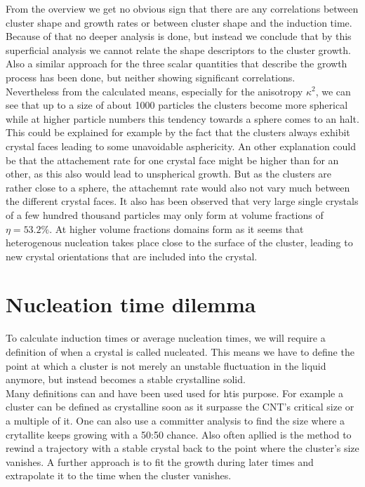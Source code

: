From the overview we get no obvious sign that there are any correlations between cluster shape and growth rates or between cluster shape and the induction time. Because of that no deeper analysis is done, but instead we conclude that by this superficial analysis we cannot relate the shape descriptors to the cluster growth. Also a similar approach for the three scalar quantities that describe the growth process has been done, but neither showing significant correlations.\\  

Nevertheless from the calculated means, especially for the anisotropy $\kappa^2$, we can see that up to a size of about 1000 particles the clusters become more spherical while at higher particle numbers this tendency towards a sphere comes to an halt. This could be explained for example by the fact that the clusters always exhibit crystal faces leading to some unavoidable asphericity. An other explanation could be that the attachement rate for one crystal face might be higher than for an other, as this also would lead to unspherical growth. But as the clusters are rather close to a sphere, the attachemnt rate would also not vary much between the different crystal faces. It also has been observed that very large single crystals of a few hundred thousand particles may only form at volume fractions of $\eta = 53.2 \%$. At higher volume fractions domains form as it seems that heterogenous nucleation takes place close to the surface of the cluster, leading to new crystal orientations that are included into the crystal.\\


\section{Nucleation time dilemma}
\label{sec:nucleation_times}
To calculate induction times or average nucleation times, we will require a definition of when a crystal is called nucleated. This means we have to define the point at which a cluster is not merely an unstable fluctuation in the liquid anymore, but instead becomes a stable crystalline solid.\\
Many definitions can and have been used used for htis purpose. For example a cluster can be defined as crystalline soon as it surpasse the CNT's critical size or a multiple of it. One can also use a committer analysis to find the size where a crytallite keeps growing with a 50:50 chance. Also often apllied is the method to rewind a trajectory with a stable crystal back to the point where the cluster's size vanishes. A further approach is to fit the growth during later times and extrapolate it to the time when the cluster vanishes.\\

